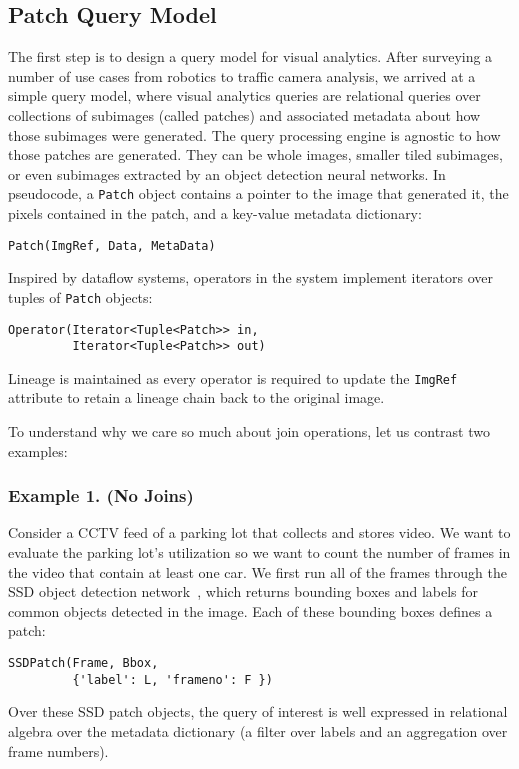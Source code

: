 \subsection{Patch Query Model}
The first step is to design a query model for visual analytics.
After surveying a number of use cases from robotics to traffic camera analysis, we arrived at a simple query model, where visual analytics queries are relational queries over collections of subimages (called patches) and associated metadata about how those subimages were generated.
The query processing engine is agnostic to how those patches are generated.
They can be whole images, smaller tiled subimages, or even subimages extracted by an object detection neural networks.
In pseudocode, a \texttt{Patch} object contains a pointer to the image that generated it, the pixels contained in the patch, and a key-value metadata dictionary:
\begin{lstlisting}
Patch(ImgRef, Data, MetaData)
\end{lstlisting}
Inspired by dataflow systems, operators in the system implement iterators over tuples of \texttt{Patch} objects:
\begin{lstlisting}
Operator(Iterator<Tuple<Patch>> in, 
         Iterator<Tuple<Patch>> out)
\end{lstlisting}
Lineage is maintained as every operator is required to update the \texttt{ImgRef} attribute to retain a lineage chain back to the original image.

To understand why we care so much about join operations, let us contrast two examples:

\subsubsection{Example 1. (No Joins)}
Consider a CCTV feed of a parking lot that collects and stores video.
We want to evaluate the parking lot's utilization so we want to count the number of frames in the video that contain at least one car.
We first run all of the frames through the SSD object detection network~\cite{liu2016ssd}, which returns bounding boxes and labels for common objects detected in the image.
Each of these bounding boxes defines a patch:
\begin{lstlisting}
SSDPatch(Frame, Bbox, 
         {'label': L, 'frameno': F })
\end{lstlisting}
Over these SSD patch objects, the query of interest is well expressed in relational algebra over the metadata dictionary (a filter over labels and an aggregation over frame numbers).

